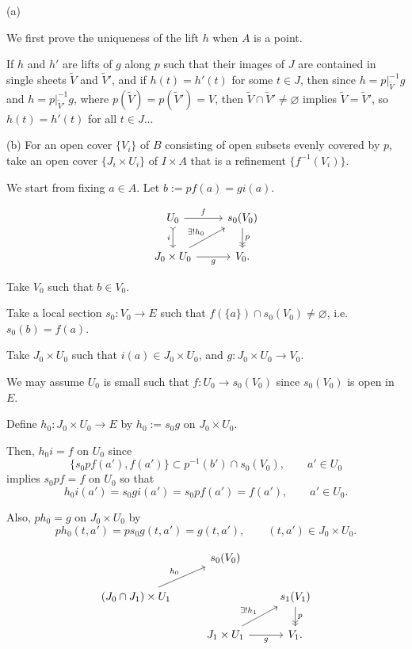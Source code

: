 \documentclass{../../large}
\begin{document}
\begin{pf}



(a)


We first prove the uniqueness of the lift $h$ when $A$ is a point.



If $h$ and $h'$ are lifts of $g$ along $p$ such that their images of $J$ are contained in single sheets $\tilde V$ and $\tilde V'$, and if $h(t)=h'(t)$ for some $t\in J$, then since $h=p|_{\tilde V}^{-1}g$ and $h=p|_{\tilde V'}^{-1}g$, where $p(\tilde V)=p(\tilde V')=V$, then $\tilde V\cap\tilde V'\ne\varnothing$ implies $\tilde V=\tilde V'$, so $h(t)=h'(t)$ for all $t\in J$...





(b)
For an open cover $\{V_i\}$ of $B$ consisting of open subsets evenly covered by $p$, take an open cover $\{J_i\times U_i\}$ of $I\times A$ that is a refinement $\{f^{-1}(V_i)\}$.


We start from fixing $a\in A$.
Let $b:=pf(a)=gi(a)$.

\[\begin{tikzcd}
U_0\rar{f}\dar[>->,swap]{i}&s_0(V_0)\dar[->>]{p}\\
J_0\times U_0\rar[swap]{g}\ar{ur}{\exists!h_0}&V_0.
\end{tikzcd}\]

Take $V_0$ such that $b\in V_0$.

Take a local section $s_0:V_0\to E$ such that $f(\{a\})\cap s_0(V_0)\ne\varnothing$, i.e.~$s_0(b)=f(a)$.

Take $J_0\times U_0$ such that $i(a)\in J_0\times U_0$, and $g:J_0\times U_0\to V_0$.

We may assume $U_0$ is small such that $f:U_0\to s_0(V_0)$ since $s_0(V_0)$ is open in $E$.



Define $h_0:J_0\times U_0\to E$ by $h_0:=s_0g$ on $J_0\times U_0$.

Then, $h_0i=f$ on $U_0$ since
\[\{s_0pf(a'),f(a')\}\subset p^{-1}(b')\cap s_0(V_0),\qquad a'\in U_0\]
implies $s_0pf=f$ on $U_0$ so that
\[h_0i(a')=s_0gi(a')=s_0pf(a')=f(a'),\qquad a'\in U_0.\]

Also, $ph_0=g$ on $J_0\times U_0$ by
\[ph_0(t,a')=ps_0g(t,a')=g(t,a'),\qquad(t,a')\in J_0\times U_0.\]


\[\begin{tikzcd}
&s_0(V_0)&\\
(J_0\cap J_1)\times U_1\ar{ur}{h_0}&&s_1(V_1)\dar[->>]{p}\\
&J_1\times U_1\rar[swap]{g}\ar{ur}{\exists!h_1}&V_1.
\end{tikzcd}\]


\end{pf}
\end{document}
